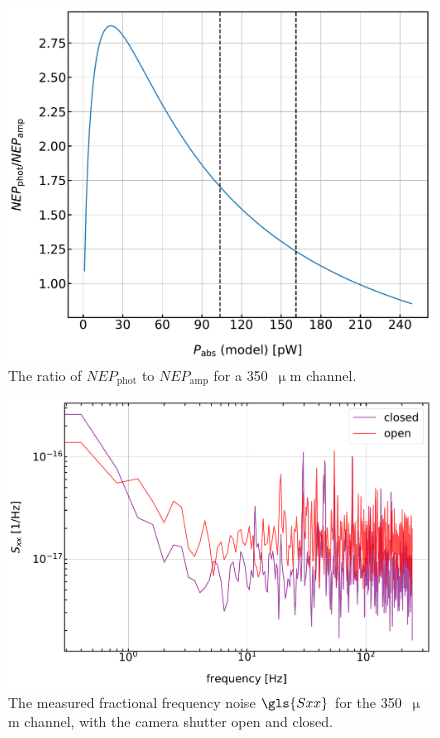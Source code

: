 \begin{figure}[!htbp]
\centering
\includegraphics[width=\textwidth]{figures/blast_data/sweeps/350_NEPphotNEPamp}
\caption[~Model ratio of  to  for a  350~ channel.]{The ratio of $NEP_{\mathrm{phot}}$ to $NEP_{\mathrm{amp}}$ for a 350~$\upmu$m channel.}
\label{fig:nep ratio}
\end{figure}

\begin{figure}[!htbp]
\centering
\includegraphics[width=\textwidth]{figures/blast_data/sweeps/350_model_psds}
\caption[~Fractional frequency noise for the camera shutter open and closed.]{The measured fractional frequency noise $\gls{Sxx}$ for the 350~$\upmu$m channel, with the camera shutter open and closed.}
\label{fig:350 chan psd}
\end{figure}

